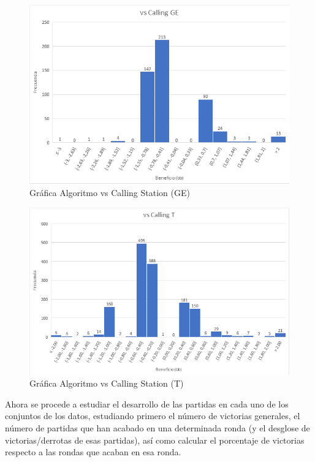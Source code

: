 \begin{figure}[h]
\centering
\includegraphics[width=1\textwidth]{figuras/AvCGE.png}   
\caption{Gráfica Algoritmo vs Calling Station (GE)}
\label{fig:AvRCE}
\end{figure}

\begin{figure}[h]
\centering
\includegraphics[width=1\textwidth]{figuras/AvCT.png}   
\caption{Gráfica Algoritmo vs Calling Station (T)}
\label{fig:AvRCT}
\end{figure}

Ahora se procede a estudiar el desarrollo de las partidas en cada uno de los conjuntos de los datos, estudiando primero el número de victorias generales, el número de partidas que han acabado en una determinada ronda (y el desglose de victorias/derrotas de esas partidas), así como calcular el porcentaje de victorias respecto a las rondas que acaban en esa ronda.


